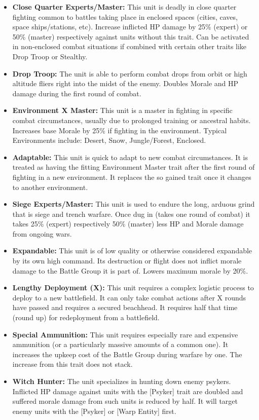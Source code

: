 \begin{itemize}
 	\item \textbf{Close Quarter Experts/Master:} This unit is deadly in close quarter fighting common to battles taking place in enclosed spaces (cities, caves, space ships/stations, etc). Increase inflicted HP damage by 25\% (expert) or 50\% (master) respectively against units without this trait. Can be activated in non-enclosed combat situations if combined with certain other traits like Drop Troop or Stealthy.
 	\item \textbf{Drop Troop:} The unit is able to perform combat drops from orbit or high altitude fliers right into the midst of the enemy. Doubles Morale and HP damage during the first round of combat.
 	\item \textbf{Environment X Master:} This unit is a master in fighting in specific combat circumstances, usually due to prolonged training or ancestral habits. Increases base Morale by 25\% if fighting in the environment. Typical Environments include: Desert, Snow, Jungle/Forest, Enclosed.
 	\item \textbf{Adaptable:} This unit is quick to adapt to new combat circumstances. It is treated as having the fitting Environment Master trait after the first round of fighting in a new environment. It replaces the so gained trait once it changes to another environment.
 	\item \textbf{Siege Experts/Master:} This unit is used to endure the long, arduous grind that is siege and trench warfare. Once dug in (takes one round of combat) it takes 25\% (expert) respectively 50\% (master) less HP and Morale damage from ongoing wars.
 	\item \textbf{Expandable:} This unit is of low quality or otherwise considered expandable by its own high command. Its destruction or flight does not inflict morale damage to the Battle Group it is part of. Lowers maximum morale by 20\%.
 	\item \textbf{Lengthy Deployment (X):} This unit requires a complex logistic process to deploy to a new battlefield. It can only take combat actions after X rounds have passed and requires a secured beachhead. It requires half that time (round up) for redeployment from a battlefield. 
 	\item \textbf{Special Ammunition:} This unit requires especially rare and expensive ammunition (or a particularly massive amounts of a common one). It increases the upkeep cost of the Battle Group during warfare by one. The increase from this trait does not stack.
 	\item \textbf{Witch Hunter:} The unit specializes in hunting down enemy psykers. Inflicted HP damage against units with the [Psyker] trait are doubled and suffered morale damage from such units is reduced by half. It will target enemy units with the [Psyker] or [Warp Entity] first.

\end{itemize}
